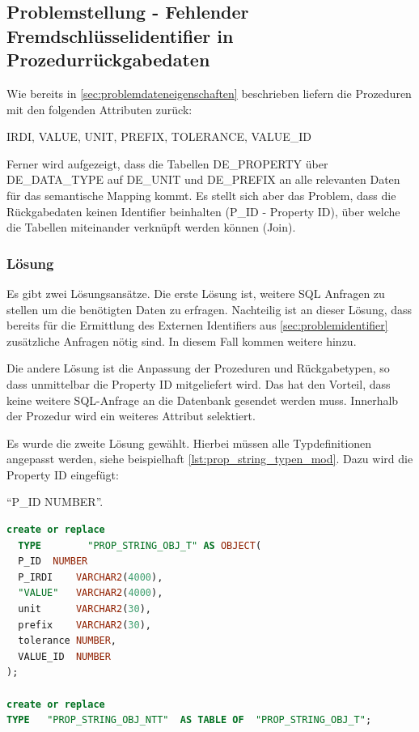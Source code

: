\subsection{Problemstellung - Fehlender Fremdschlüsselidentifier in Prozedurrückgabedaten}

Wie bereits in \autoref{sec:problemdateneigenschaften} beschrieben liefern die Prozeduren mit den folgenden Attributen zurück: 

IRDI, VALUE, UNIT, PREFIX, TOLERANCE, VALUE\_ID

Ferner wird aufgezeigt, dass die Tabellen DE\_PROPERTY über DE\_DATA\_TYPE auf DE\_UNIT und DE\_PREFIX an alle relevanten Daten für das semantische Mapping kommt. Es stellt sich aber das Problem, dass die Rückgabedaten keinen Identifier beinhalten (P\_ID - Property ID), über welche die Tabellen miteinander verknüpft werden können (Join). 
 
\subsubsection{Lösung}

Es gibt zwei Lösungsansätze. Die erste Lösung ist, weitere SQL Anfragen zu stellen um die benötigten Daten zu erfragen. Nachteilig ist an dieser Lösung, dass bereits für die Ermittlung des Externen Identifiers aus \autoref{sec:problemidentifier} zusätzliche Anfragen nötig sind. In diesem Fall kommen weitere hinzu. 

Die andere Lösung ist die Anpassung der Prozeduren und Rückgabetypen, so dass unmittelbar die Property ID mitgeliefert wird. Das hat den Vorteil, dass keine weitere SQL-Anfrage an die Datenbank gesendet werden muss. Innerhalb der Prozedur wird ein weiteres Attribut selektiert. 

Es wurde die zweite Lösung gewählt. Hierbei müssen alle Typdefinitionen angepasst werden, siehe beispielhaft \autoref{lst:prop_string_typen_mod}. Dazu wird die Property ID eingefügt:

\enquote{P\_ID	 NUMBER}.

 \begin{lstlisting}[caption=PROP\_STRING\_OBJ Typanpassung, language=sql, label=lst:prop_string_typen_mod]
create or replace
  TYPE        "PROP_STRING_OBJ_T" AS OBJECT(
  P_ID	NUMBER
  P_IRDI    VARCHAR2(4000),
  "VALUE"   VARCHAR2(4000),
  unit      VARCHAR2(30),
  prefix    VARCHAR2(30),
  tolerance NUMBER,
  VALUE_ID  NUMBER
);

create or replace
TYPE   "PROP_STRING_OBJ_NTT"  AS TABLE OF  "PROP_STRING_OBJ_T";
\end{lstlisting}

